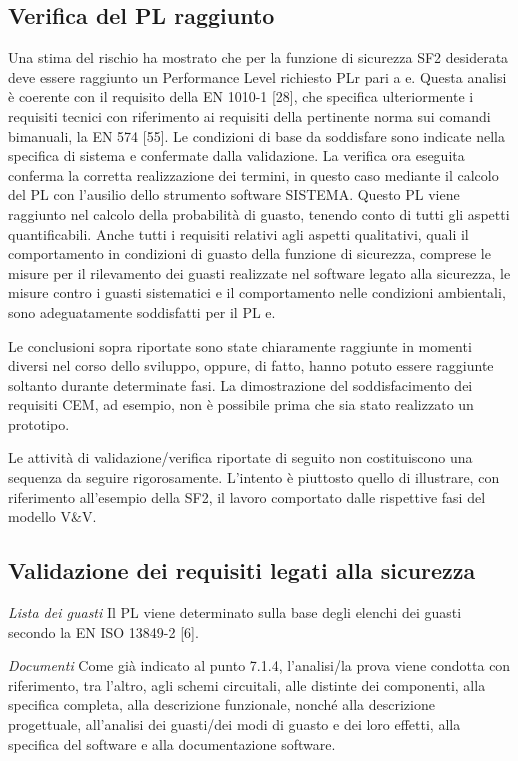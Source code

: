 \subsection{Verifica del PL raggiunto }
\label{sec:07-8-1}
Una stima del rischio ha mostrato che per la funzione di sicurezza SF2 desiderata deve essere raggiunto un Performance Level richiesto PLr pari a e. Questa analisi è coerente con il requisito della EN 1010-1 [28], che specifica ulteriormente i requisiti tecnici con riferimento ai requisiti della pertinente norma sui comandi bimanuali, la EN 574 [55]. Le condizioni di base da soddisfare sono indicate nella specifica di sistema e confermate dalla validazione. La verifica ora eseguita conferma la corretta realizzazione dei termini, in questo caso mediante il calcolo del PL con l'ausilio dello strumento software SISTEMA. Questo PL viene raggiunto nel calcolo della probabilità di guasto, tenendo conto di tutti gli aspetti quantificabili. Anche tutti i requisiti relativi agli aspetti qualitativi, quali il comportamento in condizioni di guasto della funzione di sicurezza, comprese le misure per il rilevamento dei guasti realizzate nel software legato alla sicurezza, le misure contro i guasti sistematici e il comportamento nelle condizioni ambientali, sono adeguatamente soddisfatti per il PL e.

Le conclusioni sopra riportate sono state chiaramente raggiunte in momenti diversi nel corso dello sviluppo, oppure, di fatto, hanno potuto essere raggiunte soltanto durante determinate fasi. La dimostrazione del soddisfacimento dei requisiti CEM, ad esempio, non è possibile prima che sia stato realizzato un prototipo.

Le attività di validazione/verifica riportate di seguito non costituiscono una sequenza da seguire rigorosamente. L'intento è piuttosto quello di illustrare, con riferimento all'esempio della SF2, il lavoro comportato dalle rispettive fasi del modello V\&V.

\subsection{Validazione dei requisiti legati alla sicurezza}
\label{sec:07-8-2}

\textit{Lista dei guasti}
Il PL viene determinato sulla base degli elenchi dei guasti secondo la EN ISO 13849-2 [6].

\textit{Documenti}
Come già indicato al punto 7.1.4, l'analisi/la prova viene condotta con riferimento, tra l'altro, agli schemi circuitali, alle distinte dei componenti, alla specifica completa, alla descrizione funzionale, nonché alla descrizione progettuale, all'analisi dei guasti/dei modi di guasto e dei loro effetti, alla specifica del software e alla documentazione software.

